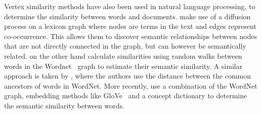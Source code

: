 Vertex similarity methods have also been used in natural
language processing, to determine the similarity between
words and documents. \citet{semantic-similarity} make use
of a diffusion process on a lexicon graph where nodes
are terms in the text and edges represent co-occurrence.
This allows them to discover semantic relationships between
nodes that are not directly connected in the graph, but
can however be semantically related. \citet{semantic-sim-random-walk}
on the other hand calculate similarities using random walks between words
in the Wordnet~\cite{wordnet} graph to estimate their semantic
similarity. A similar approach is taken by \citet{wordnet-graph-sim},
where the authors use the distance between the common ancestors
of words in WordNet. More recently, \citet{word-sim-concepts} use
a combination of the WordNet graph, embedding methods like GloVe~\cite{glove}
and a concept dictionary to determine the semantic similarity between
words.
